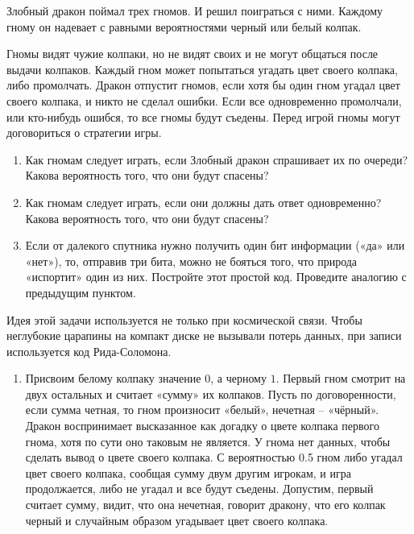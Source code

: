 \documentclass[a4paper]{caesar_book}
\theoremstyle{definition}
\newcounter{problem}
\newenvironment{problem}%
{%
\refstepcounter{problem}%
     \hypertarget{problem:{\theproblem}}{}
     \Writetofile{solution_file}{\protect\hypertarget{soln:\theproblem}{}}
     \begin{myenum}[label=\bfseries\protect\hyperlink{soln:\theproblem}{\theproblem}, ref=\theproblem, leftmargin=0pt]
     \item%
    }%
    {%
    \end{myenum}}
\begin{document}
\begin{problem}
Злобный дракон поймал трех гномов. И решил поиграться с ними.
Каждому гному он надевает с равными вероятностями черный или белый колпак.


Гномы видят чужие колпаки, но не видят своих и не могут общаться после выдачи колпаков.
Каждый гном может попытаться угадать цвет своего колпака, либо промолчать.
Дракон отпустит гномов, если хотя бы один гном угадал цвет своего колпака,
и никто не сделал ошибки. Если все одновременно промолчали, или кто-нибудь ошибся,
то все гномы будут съедены. Перед игрой гномы могут договориться о стратегии игры.

\begin{enumerate}
\item Как гномам следует играть, если Злобный дракон спрашивает их по очереди?
Какова вероятность того, что они будут спасены?
\item Как гномам следует играть, если они должны дать ответ одновременно?
Какова вероятность того, что они будут спасены?
\item Если от далекого спутника нужно получить один бит информации («да» или «нет»),
то, отправив три бита, можно не бояться того, что природа «испортит» один из них.
Постройте этот простой код. Проведите аналогию с предыдущим пунктом.
\end{enumerate}
Идея этой задачи используется не только при космической связи.
Чтобы неглубокие царапины на компакт диске не вызывали потерь данных,
при записи используется код Рида-Соломона.

\begin{sol}
\begin{enumerate}
\item Присвоим белому колпаку значение $0$, а черному $1$. Первый гном смотрит
на двух остальных и считает «сумму» их колпаков. Пусть по договоренности,
если сумма четная, то гном произносит «белый», нечетная – «чёрный».
Дракон воспринимает высказанное как догадку о цвете колпака первого гнома,
хотя по сути оно таковым не является. У гнома нет данных,
чтобы сделать вывод о цвете своего колпака. С вероятностью 0.5 гном
либо угадал цвет своего колпака, сообщая сумму двум другим игрокам,
и игра продолжается, либо не угадал и все будут съедены.
Допустим, первый считает сумму, видит, что она нечетная, говорит дракону,
что его колпак черный и случайным образом угадывает цвет своего колпака.


\end{enumerate}
\end{sol}
\end{problem}
\end{document}
